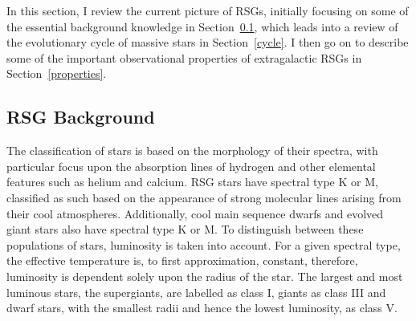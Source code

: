 \documentclass[a4paper,12pt]{article}
\begin{document}
In this section, I review the current picture of RSGs, initially focusing on some of the essential background knowledge in Section~\ref{background}, which leads into a review of the evolutionary cycle of massive stars in Section~\ref{cycle}.
I then go on to describe some of the important observational properties of extragalactic RSGs in Section~\ref{properties}.

\subsection{RSG Background}\label{background}



The classification of stars is based on the morphology of their spectra, with particular focus upon the absorption lines of hydrogen and other elemental features such as helium and calcium. 
RSG stars have spectral type K or M, classified as such based on the appearance of strong molecular lines arising from their cool atmospheres.
Additionally, cool main sequence dwarfs and evolved giant stars also have spectral type K or M.
To distinguish between these populations of stars, luminosity is taken into account.
For a given spectral type, the effective temperature is, to first approximation, constant, therefore, luminosity is dependent solely upon the radius of the star.
The largest and most luminous stars, the supergiants, are labelled as class I, giants as class III and dwarf stars, with the smallest radii and hence the lowest luminosity, as class V. 
\end{document}

